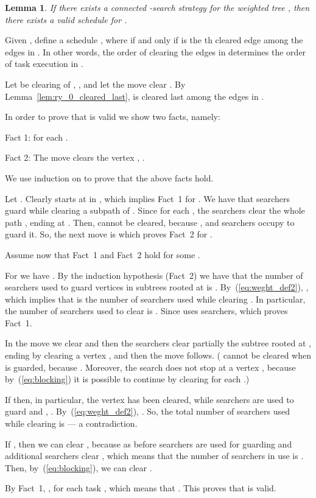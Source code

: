\documentclass[10pt]{article}
\newenvironment{proof}[1][Proof]
{\par\noindent{\bf #1:} }{\hspace*{\fill}\nolinebreak{}\bigskip\par}
\newtheorem{lemma}{Lemma}
\begin{document}
\begin{lemma} \label{lem:search_to_scheduling}
If there exists a connected -search strategy  for the weighted tree , then there exists a valid schedule for .
\end{lemma}
\begin{proof}
Given , define a schedule , where  if and only if  is the th cleared edge among the edges in . In other words, the order of clearing the edges in  determines the order of task execution in .

Let  be clearing of , , and let the move  clear .
By Lemma~\ref{lem:ry_0_cleared_last},  is cleared last among the edges in .

In order to prove that  is valid we show two facts, namely:
\begin{list}{}{}
\item[Fact 1:]  for each .
\item[Fact 2:] The move  clears the vertex , .
\end{list}

We use induction on  to prove that the above facts hold.

Let . Clearly  starts at  in , which implies Fact~1 for . We have that  searchers guard  while clearing a subpath of . Since  for each , the searchers clear the whole path , ending at . Then,  cannot be cleared, because , and  searchers occupy  to guard it. So, the next move is  which proves Fact~2 for .

Assume now that Fact~1 and Fact~2 hold for some .

For  we have . By the induction hypothesis (Fact~2) we have that the number of searchers used to guard vertices in subtrees rooted at  is . By~(\ref{eq:weght_def2}), , which implies that  is the number of searchers used while clearing . In particular, the number of searchers used to clear  is . Since  uses  searchers,  which proves Fact~1.

In the move  we clear  and then the searchers clear partially the subtree rooted at , ending by clearing a vertex ,  and then the move  follows. ( cannot be cleared when  is guarded, because . Moreover, the search does not stop at a vertex , because by~(\ref{eq:blocking}) it is possible to continue by clearing  for each .)

If  then, in particular, the vertex  has been cleared, while  searchers are used to guard  and , . By~(\ref{eq:weght_def2}), . So, the total number of searchers used while clearing  is  --- a contradiction.

If , then we can clear , because as before  searchers are used for guarding and  additional searchers clear , which means that the number of searchers in use is . Then, by~(\ref{eq:blocking}), we can clear .

By Fact~1, , for each task , which means that . This proves that  is valid.
\end{proof}
\end{document}

